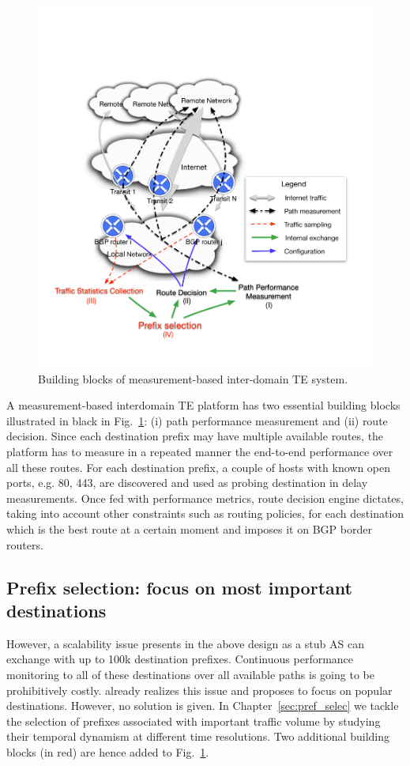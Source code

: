 \begin{figure}[!htb]
\centering
\includegraphics[width=\textwidth]{gfx/chap1/archi.pdf}
\caption{Building blocks of measurement-based inter-domain TE system.}
\label{fig:archi}
\end{figure}

A measurement-based interdomain TE platform has two essential building blocks illustrated in black in Fig.~\ref{fig:archi}: (i) path performance measurement and (ii) route decision.
Since each destination prefix may have multiple available routes, the platform has to measure in a repeated manner the end-to-end performance over all these routes. 
For each destination prefix, a couple of hosts with known open ports, e.g. 80, 443, are discovered and used as probing destination in delay measurements.
Once fed with performance metrics, route decision engine dictates,  taking into account other constraints such as routing policies, for each destination which is the best route at a certain moment and imposes it on BGP border routers.

\subsection{Prefix selection: focus on most important destinations}
However, a scalability issue presents in the above design as a stub AS can exchange with up to 100k destination prefixes.
Continuous performance monitoring to all of these destinations over all available paths is going to be prohibitively costly.
\cite{Feamster2003} already realizes this issue and proposes to focus on popular destinations.
However, no solution is given.
In Chapter~\ref{sec:pref_selec} we tackle the selection of prefixes associated with important traffic volume by studying their temporal dynamism at different time resolutions. Two additional building blocks (in red) are hence added to Fig.~\ref{fig:archi}.

